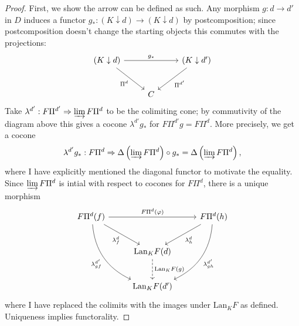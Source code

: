 \begin{proof}
	First, we show the arrow can be defined as such. Any morphism $g : d \to d'$ in $D$ induces a functor $g_* : (K\downarrow d) \to (K\downarrow d)$ by postcomposition; since postcomposition doesn't change the starting objects this commutes with the projections:
	\[\begin{tikzcd}[row sep = 2.5em, column sep = 2.5em]
		(K\downarrow d) \ar[" g_* ", rr] \ar[" \Pi^d "', dr] &  & (K\downarrow d') \ar[" \Pi^{d'}  ", dl] \\
	 & C & 
	\end{tikzcd}\]
	Take $\lambda^{d'} : F\Pi^{d'}  \Rightarrow \varinjlim F\Pi^d$ to be the colimiting cone; by commutivity of the diagram above this gives a cocone $\lambda^{d'}  g_*$ for $F\Pi^{d'} g=F\Pi^d$. More precisely, we get a cocone
	\[
		\lambda^{d'} g_* : F\Pi^d \Rightarrow \Delta\left( \varinjlim F\Pi^d \right) \circ g_* = \Delta\left( \varinjlim F\Pi^d \right) ,
	\]
	where I have explicitly mentioned the diagonal functor to motivate the equality. Since $\varinjlim F\Pi^d$ is intial with respect to cocones for $F\Pi^d$, there is a unique morphism
	\[\begin{tikzcd}[row sep = 2.5em, column sep = 2.5em]
	F\Pi^d(f)\ar[" F\Pi^d(\varphi )", rr] \ar[" \lambda^{d}_{f} "', dr] \ar[" \lambda^{d'}_{gf} "', bend right, ddr]  &  & F\Pi^d(h) \ar[" \lambda^{d}_h ", dl] \ar[" \lambda^{d'}_{gh}  ", bend left, ddl]  \\
	 & \mathrm{Lan}_KF(d) \ar[" \mathrm{Lan} _KF(g) ", dashed, d]  &  \\
	 & \mathrm{Lan}_KF(d') & 
	\end{tikzcd}\]
	where I have replaced the colimits with the images under $\mathrm{Lan} _KF$ as defined. Uniqueness implies functorality.


\end{proof}
